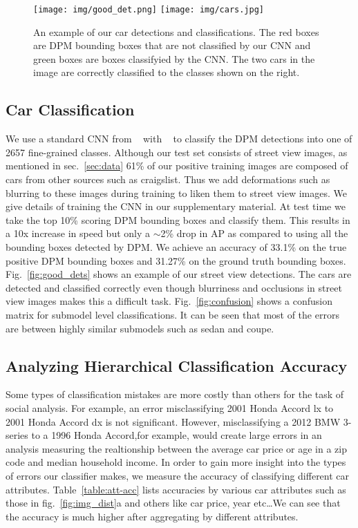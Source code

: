 \documentclass[10pt,twocolumn,letterpaper]{article}
\begin{document}
\begin{figure} [t]
\begin{center}
\texttt{[image: img/good\_det.png]}
\raisebox{-0.02\height}
 {
\texttt{[image: img/cars.jpg]}
 }
\end{center}
\caption {An example of our car detections and classifications. The red boxes are DPM bounding boxes that are not classified by our CNN and green boxes are boxes classifyied by the CNN. The two cars in the image are correctly classified to the classes shown on the right.}
\label{fig:dets}
\end{figure}

\subsection{Car Classification}
We use a standard CNN from ~\cite{alexnet} with ~\cite{caffe} to classify the DPM detections into one of 2657 fine-grained classes. Although our test set consists of street view images, as mentioned in sec.~\ref{sec:data} 61\% of our positive training images are composed of cars from other sources such as craigslist. Thus we add deformations such as blurring to these images during training to liken them to street view images. We give details of training the CNN in our supplementary material. At test time we take the top 10\% scoring DPM bounding boxes and classify them. This results in a 10x increase in speed but only a \(\sim\)2\% drop in AP as compared to using all the bounding boxes detected by DPM. We achieve an accuracy of 33.1\% on the true positive DPM bounding boxes and 31.27\% on the ground truth bounding boxes. Fig.~\ref{fig:good_dets} shows an example of our street view detections. The cars are detected and classified correctly even though blurriness and occlusions in street view images makes this a difficult task. Fig.~\ref{fig:confusion} shows a confusion matrix for submodel level classifications. It can be seen that most of the errors are between highly similar submodels such as sedan and coupe.   

\subsection{Analyzing Hierarchical Classification Accuracy}
Some types of classification mistakes are more costly than others for the task of social analysis. For example, an error misclassifying 2001 Honda Accord lx to 2001 Honda Accord dx is not significant. However, misclassifying a 2012 BMW 3-series to a 1996 Honda Accord,for example, would create large errors in an analysis measuring the realtionship between the average car price or age in a zip code and median household income. In order to gain more insight into the types of errors our classifier makes, we measure the accuracy of classifying different car attributes. Table~\ref{table:att-acc} lists accuracies by various car attributes such as those in fig.~\ref{fig:img_dist}a and others like car price, year etc\ldots We can see that the accuracy is much higher after aggregating by different attributes.  
\end{document}
